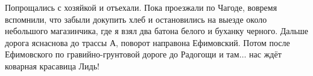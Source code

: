 Попрощались с хозяйкой и отъехали. Пока проезжали по Чагоде, вовремя вспомнили, что забыли докупить хлеб и остановились на выезде около небольшого магазинчика, где я взял два батона белого и буханку черного. Дальше дорога ясна\mdash снова до трассы А, поворот направо\mdash на Ефимовский. Потом после Ефимовского по гравийно-грунтовой дороге до Радогощи и там$\ldots$ нас ждёт коварная красавица Лидь!

\begin{center}
\end{center}